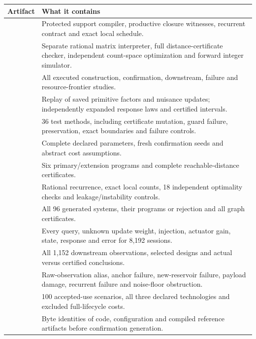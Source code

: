\documentclass[11pt,letterpaper]{article}
\theoremstyle{definition}\newtheorem{definition}[theorem]{Definition}
\theoremstyle{remark}\newtheorem{remark}[theorem]{Remark}
\begin{document}
\begingroup\small\renewcommand{\arraystretch}{1.0}
\begin{longtable}{P{6.5cm}P{9cm}}
\toprule
Artifact & What it contains\\
\midrule\endhead
{} & Protected support compiler, productive closure witnesses, recurrent contract and exact local schedule.\\
 & Separate rational matrix interpreter, full distance-certificate checker, independent count-space optimization and forward integer simulator.\\
 & All executed construction, confirmation, downstream, failure and resource-frontier studies.\\
 & Replay of saved primitive factors and nuisance updates; independently expanded response laws and certified intervals.\\
 & 36 test methods, including certificate mutation, guard failure, preservation, exact boundaries and failure controls.\\
 & Complete declared parameters, fresh confirmation seeds and abstract cost assumptions.\\
 & Six primary/extension programs and complete reachable-distance certificates.\\
 & Rational recurrence, exact local counts, 18 independent optimality checks and leakage/instability controls.\\
 & All 96 generated systems, their programs or rejection and all graph certificates.\\
 & Every query, unknown update weight, injection, actuator gain, state, response and error for 8,192 sessions.\\
 & All 1,152 downstream observations, selected designs and actual versus certified conclusions.\\
 & Raw-observation alias, anchor failure, new-reservoir failure, payload damage, recurrent failure and noise-floor obstruction.\\
 & 100 accepted-use scenarios, all three declared technologies and excluded full-lifecycle costs.\\
 & Byte identities of code, configuration and compiled reference artifacts before confirmation generation.\\
\bottomrule
\end{longtable}
\endgroup
\end{document}
